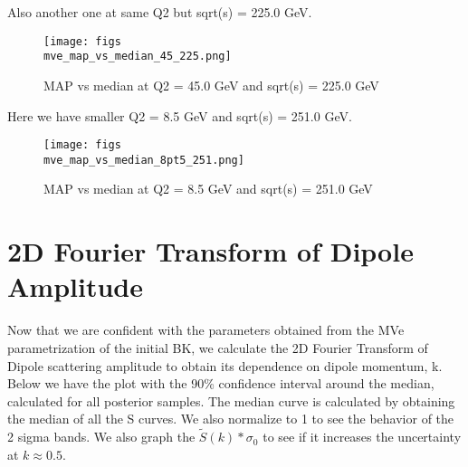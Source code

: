 \documentclass{article}
\begin{document}
Also another one at same Q2 but sqrt(s) = 225.0 GeV.

\begin{figure}
\centering
\texttt{[image: figs\\mve\_map\_vs\_median\_45\_225.png]}
\caption{MAP vs median at Q2 = 45.0 GeV and sqrt(s) = 225.0 GeV}
\label{fig:mve_map_vs_median_45_225}
\end{figure}

Here we have smaller Q2 = 8.5 GeV and sqrt(s) = 251.0 GeV.

\begin{figure}
\centering
\texttt{[image: figs\\mve\_map\_vs\_median\_8pt5\_251.png]}
\caption{MAP vs median at Q2 = 8.5 GeV and sqrt(s) = 251.0 GeV}
\label{fig:mve_map_vs_median_8pt5_251}
\end{figure}

\section{2D Fourier Transform of Dipole Amplitude}

Now that we are confident with the parameters obtained from the MVe parametrization of the initial BK, we calculate the 2D Fourier Transform of Dipole scattering amplitude to obtain its dependence on dipole momentum, k. Below we have the plot with the 90\% confidence interval around the median, calculated for all posterior samples. The median curve is calculated by obtaining the median of all the S curves. We also normalize to 1 to see the behavior of the 2 sigma bands. We also graph the $\tilde{S}(k) * \sigma_0$ to see if it increases the uncertainty at $k \approx 0.5$.
\end{document}
